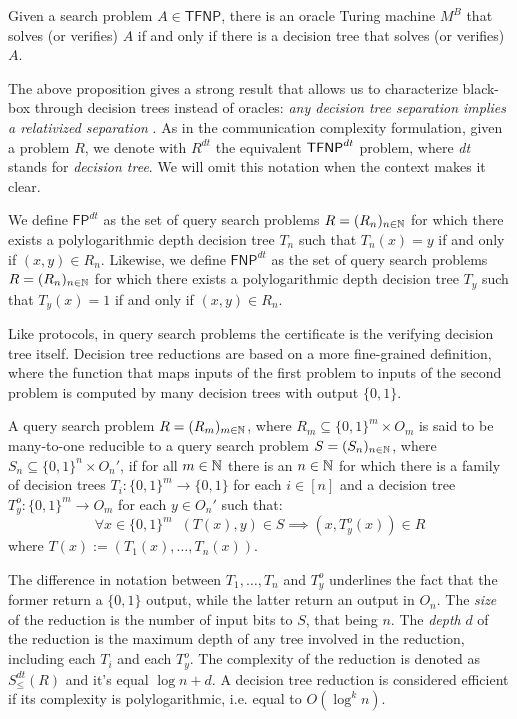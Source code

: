\begin{proposition}
    Given a search problem $A \in \mathsf{TFNP}$, there is an oracle Turing machine $M^B$ that solves (or verifies) $A$ if and only if there is a decision tree that solves (or verifies) $A$.
\end{proposition}

The above proposition gives a strong result that allows us to characterize black-box \TFNP through decision trees instead of oracles: \textit{any decision tree separation implies a relativized separation} \cite{proofs_circuits_communication, tfnp_characterization}. As in the communication complexity formulation, given a \TFNP problem $R$, we denote with $R^{dt}$ the equivalent $\textsf{TFNP}^{dt}$ problem, where \textit{dt} stands for \textit{decision tree}. We will omit this notation when the context makes it clear.

\begin{definition}
    We define $\mathsf{FP}^{dt}$ as the set of query search problems $R = (R_n)_{n \in \mathbb{N}}$ for which there exists a polylogarithmic depth decision tree $T_n$ such that $T_n(x) = y$ if and only if $(x,y) \in R_n$. Likewise, we define $\mathsf{FNP}^{dt}$ as the set of query search problems $R = (R_n)_{n \in \mathbb{N}}$ for which there exists a polylogarithmic depth decision tree $T_y$ such that $T_y(x) = 1$ if and only if $(x,y) \in R_n$.
\end{definition}

Like protocols, in query search problems the certificate is the verifying decision tree itself. Decision tree reductions are based on a more fine-grained definition, where the function that maps inputs of the first problem to inputs of the second problem is computed by many decision trees with output $\{0,1\}$.

\begin{definition}
    A query search problem $R = (R_m)_{m \in \mathbb{N}}$, where $R_m \subseteq \{0,1\}^m \times O_m$ is said to be many-to-one reducible to a query search problem $S = (S_n)_{n \in \mathbb{N}}$, where $S_n \subseteq \{0,1\}^n \times O_n'$, if for all $m \in \mathbb{N}$ there is an $n \in \mathbb{N}$ for which there is a family of decision trees $T_i : \{0,1\}^m \to \{0,1\}$ for each $i \in [n]$ and a decision tree $T_y^o : \{0,1\}^m \to O_m$ for each $y \in O_n'$ such that:
    \[\forall x \in \{0,1\}^m \;\; (T(x), y) \in S \implies (x, T_y^o(x)) \in R\]
    where $T(x) := (T_1(x), \ldots, T_n(x))$.
\end{definition}

The difference in notation between $T_1, \ldots, T_n$ and $T_y^o$ underlines the fact that the former return a $\{0,1\}$ output, while the latter return an output in $O_n$. The \textit{size} of the reduction is the number of input bits to $S$, that being $n$. The \textit{depth} $d$ of the reduction is the maximum depth of any tree involved in the reduction, including each $T_i$ and each $T_y^o$. The complexity of the reduction is denoted as $S^{dt}_\leq(R)$ and it's equal $\log n + d$. A decision tree reduction is considered efficient if its complexity is polylogarithmic, i.e. equal to $O(\log^k n)$. 

